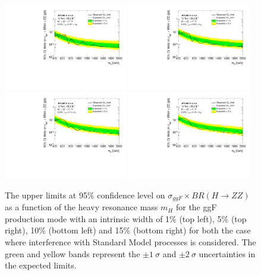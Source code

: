 \begin{figure}[h]
    \begin{center}
    \includegraphics[width=0.48\textwidth]{figures/HMHZZ/results/LWA_4l_w1.pdf}
    \includegraphics[width=0.48\textwidth]{figures/HMHZZ/results/LWA_4l_w5.pdf} \\
    \includegraphics[width=0.48\textwidth]{figures/HMHZZ/results/LWA_4l_w10.pdf}
    \includegraphics[width=0.48\textwidth]{figures/HMHZZ/results/LWA_4l_w15.pdf} \\
    \end{center}
    \caption{The upper limits at 95\% confidence level on $\sigma_{ggF} \times BR(H\rightarrow ZZ)$
    as a function of the heavy resonance mass $m_{H}$ for the ggF production mode with an intrinsic width of 1\% (top left), 5\% (top right), 10\% (bottom left) and 15\% (bottom right) for both the case where interference with Standard Model processes is considered.
    The green and yellow bands represent the $\pm 1~\sigma$ and $\pm 2~\sigma$ uncertainties in the expected limits.
  }
    \label{fig:LWAlimits_ggF_201518_withInt}
\end{figure}

